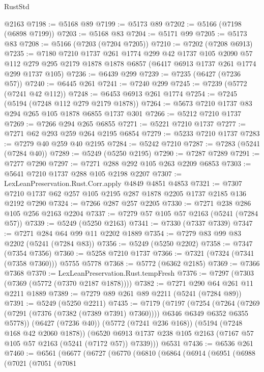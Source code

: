 \begin{lexlean}{RustStd}
\begin{coremodule}
{\begin{coremodule}
{{{{{{{{{{{{{{{{{{{{{{{{{{{{{    @2163
@7198 := @5168 @89
@7199 := @5173 @89
@7202 := @5166 (@7198 (@6898 @7199))
@7203 := @5168 @83
@7204 := @5171 @99
@7205 := @5173 @83
@7208 := @5166 (@7203 (@7204 @7205))
@7210 := @7202 (@7208 @6913)
@7235 := @7180
    @7210
    @1737
    @261
    @1774
    @299
    @42
    @1737
    @105
    @2090
    @57
    @112
    @279
    @295
    @2179
    @1878
    @1878
    @6857
    (@6417 @6913 @1737 @261 @1774 @299 @1737 @105)
@7236 := @6439 @299
@7239 := @7235 (@6427 (@7236 @57))
@7240 := @6445 @261
@7241 := @7240 @299
@7245 := @7239 (@5772 (@7241 @42 @112))
@7248 := @6453 @6913 @261 @1774
@7254 := @7245 (@5194 (@7248 @112 @279 @2179 @1878))
@7264 := @5673 @7210 @1737 @83 @294 @265 @105 @1878 @6855 @1737 @301
@7266 := @5212 @7210 @1737
@7269 := @7266 @294 @265 @6855
@7271 := @5221 @7210 @1737
@7277 := @7271 @62 @293 @259 @264 @2195 @6854
@7279 := @5233 @7210 @1737
@7283 := @7279 @40 @259 @40 @2195
@7284 := @5242 @7210
@7287 := @7283 (@5241 (@7284 @40))
@7289 := @5249 (@5250 @2195)
@7290 := @7287 @7289
@7291 := @7277 @7290
@7297 := @7271 @288 @292 @105 @263 @2209 @6853
@7303 := @5641 @7210 @1737 @288 @105 @2198 @2207
@7307 := LexLeanPreservation.Rust.Corr.apply @4849 @4851 @4853
@7321 := @7307 @7210 @1737 @62 @257 @105 @2195 @287 @1878 @2205 @1737 @2185 @136 @2192 @7290
@7324 := @7266 @287 @257 @2205
@7330 := @7271 @238 @286 @105 @256 @2163 @2204
@7337 := @7279 @57 @105 @57 @2163 (@5241 (@7284 @57))
@7339 := @5249 (@5250 @2163)
@7341 := @7330 (@7337 @7339)
@7347 := @7271 @284 @64 @99 @11 @2202 @1889
@7354 := @7279 @83 @99 @83 @2202 (@5241 (@7284 @83))
@7356 := @5249 (@5250 @2202)
@7358 := @7347 (@7354 @7356)
@7360 := @5258 @7210 @1737
@7366 := @7321 (@7324 (@7341 (@7358 @7360))) @5755 @5778
@7368 := @5772 (@6362 @2185)
@7369 := @7366 @7368
@7370 := LexLeanPreservation.Rust.tempFresh
@7376 := @7297 (@7303 (@7369 (@5772 (@7370 @2187 @1878))))
@7382 := @7271 @290 @64 @261 @11 @2211 @1889
@7389 := @7279 @89 @261 @89 @2211 (@5241 (@7284 @89))
@7391 := @5249 (@5250 @2211)
@7435 := @7179
    (@7197
      (@7254
        (@7264 (@7269 (@7291 (@7376 (@7382 (@7389 @7391) @7360)))) @6346 @6349 @6352 @6355 @5778))
      (@6427 (@7236 @40))
      (@5772 (@7241 @236 @168))
      (@5194 (@7248 @168 @42 @2060 @1878))
      (@6520 @6913 @1737 @238 @105 @2163 (@7167 @57 @105 @57 @2163 (@5241 (@7172 @57)) @7339)))
    @6531
@7436 := @6536 @261
@7460 := @6561
    (@6677
      (@6727
        (@6770
          (@6810
            (@6864
              (@6914
                (@6951
                  (@6988
                    (@7021
                      (@7051
                        (@7081
}}}}}}}}}}}}}}}}}}}}}}}}}}}}}
\end{coremodule}}
\end{coremodule}
\end{lexlean}
